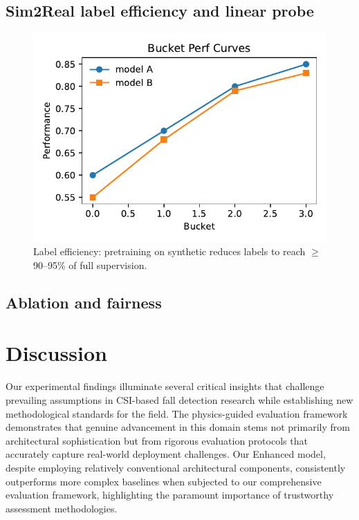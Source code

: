 \documentclass[10pt,conference]{IEEEtran}
\begin{document}
\subsection{Sim2Real label efficiency and linear probe}
\begin{figure}[t]
  \centering
  \includegraphics[width=\linewidth]{../plots/fig_sim2real_curve.pdf}
  \caption{Label efficiency: pretraining on synthetic reduces labels to reach $\geq$90--95\% of full supervision.}
  \label{fig:sim2real-curve}
\end{figure}



\subsection{Ablation and fairness}


\section{Discussion}

Our experimental findings illuminate several critical insights that challenge prevailing assumptions in CSI-based fall detection research while establishing new methodological standards for the field. The physics-guided evaluation framework demonstrates that genuine advancement in this domain stems not primarily from architectural sophistication but from rigorous evaluation protocols that accurately capture real-world deployment challenges. Our Enhanced model, despite employing relatively conventional architectural components, consistently outperforms more complex baselines when subjected to our comprehensive evaluation framework, highlighting the paramount importance of trustworthy assessment methodologies.
\end{document}
